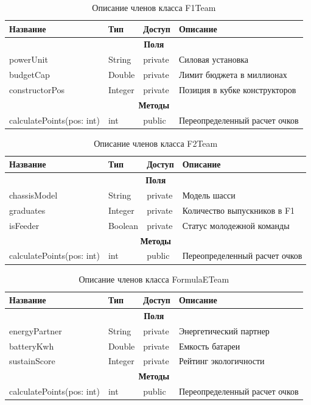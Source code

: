 \documentclass[oneside,a4paper,14pt]{extarticle}
\begin{document}
\begin{table}[H]
\centering
\caption{Описание членов класса F1Team}
\begin{tabular}{|p{4.5cm}|p{3.5cm}|p{2cm}|p{5cm}|}
\hline
\textbf{Название} & \textbf{Тип} & \textbf{Доступ} & \textbf{Описание} \\ \hline
\multicolumn{4}{|c|}{\textbf{Поля}} \\ \hline
powerUnit & String & private & Силовая установка \\ \hline
budgetCap & Double & private & Лимит бюджета в миллионах \\ \hline
constructorPos & Integer & private & Позиция в кубке конструкторов \\ \hline
\multicolumn{4}{|c|}{\textbf{Методы}} \\ \hline
calculatePoints(pos: int) & int & public & Переопределенный расчет очков \\ \hline
\end{tabular}
\end{table}

\begin{table}[H]
\centering
\caption{Описание членов класса F2Team}
\begin{tabular}{|p{4.5cm}|p{3.5cm}|p{2cm}|p{5cm}|}
\hline
\textbf{Название} & \textbf{Тип} & \textbf{Доступ} & \textbf{Описание} \\ \hline
\multicolumn{4}{|c|}{\textbf{Поля}} \\ \hline
chassisModel & String & private & Модель шасси \\ \hline
graduates & Integer & private & Количество выпускников в F1 \\ \hline
isFeeder & Boolean & private & Статус молодежной команды \\ \hline
\multicolumn{4}{|c|}{\textbf{Методы}} \\ \hline
calculatePoints(pos: int) & int & public & Переопределенный расчет очков \\ \hline
\end{tabular}
\end{table}

\begin{table}[H]
\centering
\caption{Описание членов класса FormulaETeam}
\begin{tabular}{|p{4.5cm}|p{3.5cm}|p{2cm}|p{5cm}|}
\hline
\textbf{Название} & \textbf{Тип} & \textbf{Доступ} & \textbf{Описание} \\ \hline
\multicolumn{4}{|c|}{\textbf{Поля}} \\ \hline
energyPartner & String & private & Энергетический партнер \\ \hline
batteryKwh & Double & private & Емкость батареи \\ \hline
sustainScore & Integer & private & Рейтинг экологичности \\ \hline
\multicolumn{4}{|c|}{\textbf{Методы}} \\ \hline
calculatePoints(pos: int) & int & public & Переопределенный расчет очков \\ \hline
\end{tabular}
\end{table}
\end{document}
